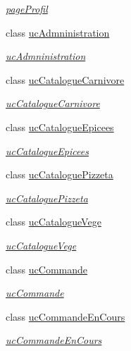 \begin{DoxyCompactItemize}
\begin{DoxyCompactList}\small\item\em \hyperlink{classnewPizza1_1_1pageProfil}{page\+Profil} \end{DoxyCompactList}\item 
class \hyperlink{classnewPizza1_1_1ucAdmninistration}{uc\+Admninistration}
\begin{DoxyCompactList}\small\item\em \hyperlink{classnewPizza1_1_1ucAdmninistration}{uc\+Admninistration} \end{DoxyCompactList}\item 
class \hyperlink{classnewPizza1_1_1ucCatalogueCarnivore}{uc\+Catalogue\+Carnivore}
\begin{DoxyCompactList}\small\item\em \hyperlink{classnewPizza1_1_1ucCatalogueCarnivore}{uc\+Catalogue\+Carnivore} \end{DoxyCompactList}\item 
class \hyperlink{classnewPizza1_1_1ucCatalogueEpicees}{uc\+Catalogue\+Epicees}
\begin{DoxyCompactList}\small\item\em \hyperlink{classnewPizza1_1_1ucCatalogueEpicees}{uc\+Catalogue\+Epicees} \end{DoxyCompactList}\item 
class \hyperlink{classnewPizza1_1_1ucCataloguePizzeta}{uc\+Catalogue\+Pizzeta}
\begin{DoxyCompactList}\small\item\em \hyperlink{classnewPizza1_1_1ucCataloguePizzeta}{uc\+Catalogue\+Pizzeta} \end{DoxyCompactList}\item 
class \hyperlink{classnewPizza1_1_1ucCatalogueVege}{uc\+Catalogue\+Vege}
\begin{DoxyCompactList}\small\item\em \hyperlink{classnewPizza1_1_1ucCatalogueVege}{uc\+Catalogue\+Vege} \end{DoxyCompactList}\item 
class \hyperlink{classnewPizza1_1_1ucCommande}{uc\+Commande}
\begin{DoxyCompactList}\small\item\em \hyperlink{classnewPizza1_1_1ucCommande}{uc\+Commande} \end{DoxyCompactList}\item 
class \hyperlink{classnewPizza1_1_1ucCommandeEnCours}{uc\+Commande\+En\+Cours}
\begin{DoxyCompactList}\small\item\em \hyperlink{classnewPizza1_1_1ucCommandeEnCours}{uc\+Commande\+En\+Cours} \end{DoxyCompactList}\item 

\end{DoxyCompactItemize}

